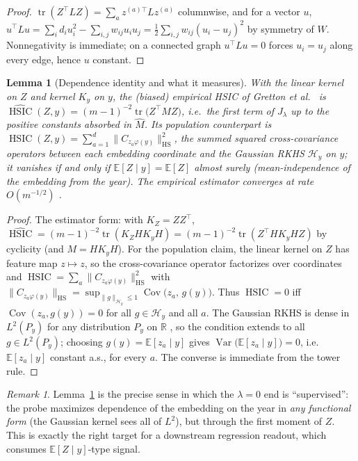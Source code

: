 \documentclass[11pt]{article}
\newtheorem{lemma}{Lemma}
\theoremstyle{remark}
\newtheorem{remark}{Remark}
\newcommand{\R}{\mathbb{R}}
\newcommand{\E}{\mathbb{E}}
\newcommand{\tr}{\operatorname{tr}}
\newcommand{\Mh}{\widehat{M}}
\newcommand{\HSIC}{\operatorname{HSIC}}
\begin{document}
\begin{proof}
$\tr(Z^{\!\top}LZ)=\sum_a z^{(a)\top}Lz^{(a)}$ columnwise, and for a vector $u$,
$u^{\!\top}Lu=\sum_i d_i u_i^2-\sum_{i,j}w_{ij}u_iu_j
=\tfrac12\sum_{i,j}w_{ij}(u_i-u_j)^2$ by symmetry of $W$. Nonnegativity is immediate;
on a connected graph $u^{\!\top}Lu=0$ forces $u_i=u_j$ along every edge, hence $u$
constant.
\end{proof}

\begin{lemma}[Dependence identity and what it measures]\label{lem:hsic}
With the linear kernel on $Z$ and kernel $K_y$ on $y$, the (biased) empirical HSIC of
Gretton et al.\ \cite{gretton2005hsic} is
$\widehat{\HSIC}(Z,y)=(m-1)^{-2}\tr\!\big(Z^{\!\top}MZ\big)$, i.e.\ the first term of
$J_\lambda$ up to the positive constants absorbed in $\Mh$. Its population counterpart is
$\HSIC(Z,y)=\sum_{a=1}^{d}\big\|C_{z_a\varphi(y)}\big\|_{\mathrm{HS}}^2$, the summed
squared cross-covariance operators between each embedding coordinate and the Gaussian
RKHS $\mathcal H_y$ on $y$; it vanishes if and only if
$\E[Z\mid y]=\E[Z]$ almost surely (mean-independence of the embedding from the year).
The empirical estimator converges at rate $O(m^{-1/2})$
\cite[Thm.~3]{gretton2005hsic}.
\end{lemma}

\begin{proof}
The estimator form: with $K_Z=ZZ^{\!\top}$,
$\widehat{\HSIC}=(m-1)^{-2}\tr(K_ZHK_yH)=(m-1)^{-2}\tr(Z^{\!\top}HK_yHZ)$ by cyclicity
(and $M=HK_yH$). For the population claim, the linear kernel on $Z$ has feature map
$z\mapsto z$, so the cross-covariance operator factorizes over coordinates and
$\HSIC=\sum_a\|C_{z_a\varphi(y)}\|^2_{\mathrm{HS}}$ with
$\|C_{z_a\varphi(y)}\|_{\mathrm{HS}}=\sup_{\|g\|_{\mathcal H_y}\le1}
\operatorname{Cov}\!\big(z_a,\,g(y)\big)$. Thus $\HSIC=0$ iff
$\operatorname{Cov}(z_a,g(y))=0$ for all $g\in\mathcal H_y$ and all $a$. The Gaussian
RKHS is dense in $L^2(P_y)$ for any distribution $P_y$ on $\R$
\cite{steinwart2008book,sriperumbudur2010}, so the condition extends to all
$g\in L^2(P_y)$; choosing $g(y)=\E[z_a\mid y]$ gives
$\operatorname{Var}\big(\E[z_a\mid y]\big)=0$, i.e.\ $\E[z_a\mid y]$ constant a.s.,
for every $a$. The converse is immediate from the tower rule.
\end{proof}

\begin{remark}
Lemma~\ref{lem:hsic} is the precise sense in which the $\lambda=0$ end is
``supervised'': the probe maximizes dependence of the embedding on the year in
\emph{any functional form} (the Gaussian kernel sees all of $L^2$), but through the
first moment of $Z$. This is exactly the right target for a downstream regression
readout, which consumes $\E[Z\mid y]$-type signal.
\end{remark}
\end{document}
